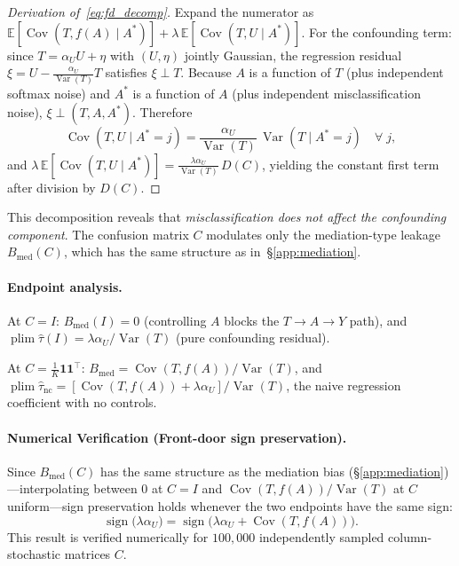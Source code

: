\begin{proof}[Derivation of~\eqref{eq:fd_decomp}]
Expand the numerator as
$\mathbb{E}[\operatorname{Cov}(T,f(A)\mid A^*)] + \lambda\,\mathbb{E}[\operatorname{Cov}(T,U\mid A^*)]$.
For the confounding term: since $T=\alpha_U U+\eta$ with $(U,\eta)$ jointly Gaussian, the regression residual $\xi=U-\frac{\alpha_U}{\operatorname{Var}(T)}T$ satisfies $\xi\perp T$.
Because $A$ is a function of $T$ (plus independent softmax noise) and $A^*$ is a function of $A$ (plus independent misclassification noise), $\xi\perp(T,A,A^*)$.
Therefore
\[
  \operatorname{Cov}(T,U\mid A^*{=}j)
  = \frac{\alpha_U}{\operatorname{Var}(T)}\,\operatorname{Var}(T\mid A^*{=}j)
  \quad\forall\;j,
\]
and $\lambda\,\mathbb{E}[\operatorname{Cov}(T,U\mid A^*)]=\frac{\lambda\alpha_U}{\operatorname{Var}(T)}\,D(C)$, yielding the constant first term after division by $D(C)$.
\end{proof}

This decomposition reveals that \emph{misclassification does not affect the confounding component}.
The confusion matrix $C$ modulates only the mediation-type leakage $B_{\mathrm{med}}(C)$, which has the same structure as in~§\ref{app:mediation}.

\paragraph{Endpoint analysis.}
At $C=I$: $B_{\mathrm{med}}(I)=0$ (controlling $A$ blocks the $T\to A\to Y$ path), and $\operatorname{plim}\hat\tau(I)=\lambda\alpha_U/\operatorname{Var}(T)$ (pure confounding residual).

At $C=\frac{1}{K}\mathbf{1}\mathbf{1}^\top$: $B_{\mathrm{med}}=\operatorname{Cov}(T,f(A))/\operatorname{Var}(T)$, and $\operatorname{plim}\hat\tau_{\mathrm{nc}}=[\operatorname{Cov}(T,f(A))+\lambda\alpha_U]/\operatorname{Var}(T)$, the naive regression coefficient with no controls.

\paragraph{Numerical Verification (Front-door sign preservation).}
\label{find:fd_sign}
Since $B_{\mathrm{med}}(C)$ has the same structure as the mediation bias (§\ref{app:mediation})---interpolating between $0$ at $C{=}I$ and $\operatorname{Cov}(T,f(A))/\operatorname{Var}(T)$ at $C$ uniform---sign preservation holds whenever the two endpoints have the same sign:
\[
  \operatorname{sign}\!\bigl(\lambda\alpha_U\bigr)
  = \operatorname{sign}\!\bigl(\lambda\alpha_U + \operatorname{Cov}(T,f(A))\bigr).
\]
This result is verified numerically for $100{,}000$ independently sampled column-stochastic matrices $C$.

